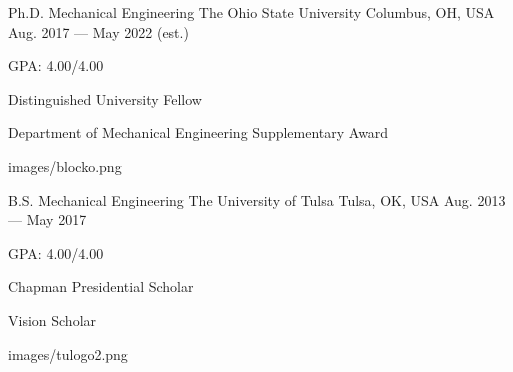 

\begin{cventries}
	
	\cveducation
	{Ph.D. Mechanical Engineering} %
	{The Ohio State University} %
	{Columbus, OH, USA} %
	{Aug. 2017 --- May 2022 (est.)} %
	{
		\begin{cvitems} %
			\item {GPA: 4.00/4.00}
			\item {Distinguished University Fellow}
			\item {Department of Mechanical Engineering Supplementary Award}
		\end{cvitems}
	}
	{images/blocko.png}

	\cveducation
    {B.S. Mechanical Engineering} %
    {The University of Tulsa} %
    {Tulsa, OK, USA} %
    {Aug. 2013 --- May 2017} %
    {
      \begin{cvitems} %
      	\item {GPA: 4.00/4.00}
        \item {Chapman Presidential Scholar}
        \item {Vision Scholar}
      \end{cvitems}
    }
	{images/tulogo2.png}
\end{cventries}
